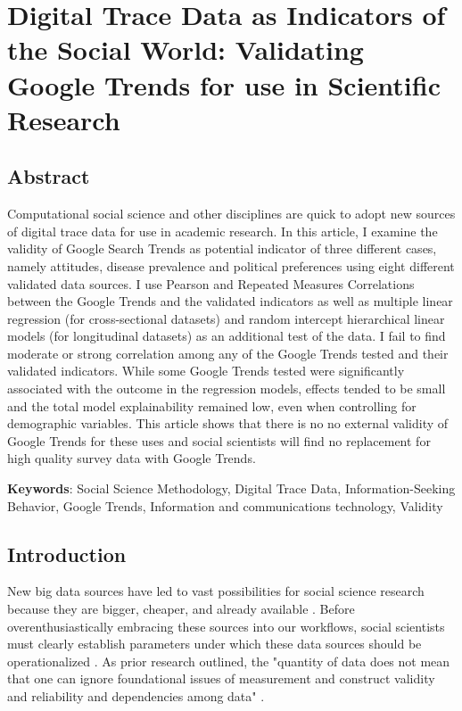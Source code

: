 \hypertarget{paper-1}{%
\chapter{Digital Trace Data as Indicators of the Social World: Validating Google Trends for use in Scientific Research}\label{paper-1}}


\section{Abstract}

Computational social science and other disciplines are quick to 
adopt new sources of digital trace data for use in academic research. 
In this article, I examine the validity of Google Search Trends 
as potential indicator of three different cases, namely attitudes, 
disease prevalence and political preferences using eight %
different validated data sources. I use Pearson and Repeated Measures Correlations 
between the Google Trends and the validated indicators as well as multiple linear regression
(for cross-sectional datasets) and random intercept hierarchical linear models
(for longitudinal datasets) as an additional test of the data. 
I fail to find moderate or strong correlation among any of the Google 
Trends tested and their validated indicators. While some Google Trends 
tested were significantly associated with the outcome in the regression models,
effects tended to be small and the total model explainability remained low,
even when controlling for demographic variables. This article shows that there is no 
no external validity of Google Trends for these uses and social scientists
will find no replacement for high quality survey data with Google Trends. 

\textbf{Keywords}: Social Science Methodology, Digital Trace Data, Information-Seeking Behavior, Google Trends, Information and communications technology, Validity

\section{Introduction}
New big data sources have led to vast possibilities for social science
research because they are bigger, cheaper, and already available
\citep{kingEnsuringDataRichFuture2011,lazerComputationalSocialScience2009,salganikBitBitSocial2017}.
Before overenthusiastically embracing these
sources into our workflows, social scientists must clearly establish
parameters under which these data sources should be operationalized
\citep{bailCulturalEnvironmentMeasuring2014, lazerParableGoogleFlu2014}. As
prior research outlined, the "quantity of data does not mean that one
can ignore foundational issues of measurement and construct validity and
reliability and dependencies among data" 
\citep[p. 1203]{lazerParableGoogleFlu2014}. 


